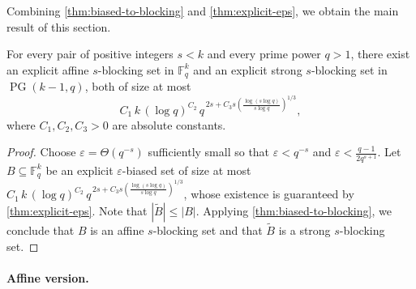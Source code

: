 \documentclass[11pt]{article}
\newif\ifdraft
\newcommand{\ZSnote}[1]{\ifdraft\textcolor{green}{[Chong: #1]}\fi}
\newcommand{\eps}{\varepsilon}
\newcommand{\ex}{\mathop{{}\mathbb{E}}}
\newcommand{\F}{\mathbb{F}}
\DeclareMathOperator{\PG}{PG}
\begin{document}
Combining \cref{thm:biased-to-blocking} and \cref{thm:explicit-eps}, we obtain the main result of this section.

\begin{proposition}\label{prop:explicit-biased-to-explicit-blocking}
For every pair of positive integers $s<k$ and every prime power $q>1$, there exist an explicit affine $s$-blocking set in $\F_q^k$ and an explicit strong $s$-blocking set in $\PG(k-1,q)$, both of size at most
\[
C_1\,k\,(\log q)^{C_2}\,q^{\,2s + C_3 s \left(\frac{\log(s\log q)}{s\log q}\right)^{1/3}},
\]
where $C_1,C_2,C_3>0$ are absolute constants.
\end{proposition}

\begin{proof}
Choose $\eps=\Theta(q^{-s})$ sufficiently small so that $\eps<q^{-s}$ and $\eps<\frac{q-1}{2q^{s+1}}$. Let $B\subseteq\F_q^k$ be an explicit $\eps$-biased set of size at most $C_1\,k\,(\log q)^{C_2}\,q^{\,2s + C_3 s \left(\frac{\log(s\log q)}{s\log q}\right)^{1/3}}$,
whose existence is guaranteed by \cref{thm:explicit-eps}. Note that $|\widetilde{B}|\le |B|$. Applying \cref{thm:biased-to-blocking}, we conclude that $B$ is an affine $s$-blocking set and that $\widetilde{B}$ is a strong $s$-blocking set.
\end{proof}

\iffalse
\ZSnote{If $S\subseteq G$ is an $\eps$-biased set with $\eps<q^{-s}$, then it is also an affine $s$-blocking set.}

\ZSnote{Let $S\subseteq G$ be an $\eps$-biased set with $\eps<\frac{q-1}{2q^{s+1}}$. Then $\tilde{B}$ is a strong $s$-blocking set. To see this, it suffices to show that for every vector space $V$ of codimension $s$ and every hypergraph $H$ of $V$, $\tilde{B}\cap(V\setminus H)\neq\emptyset$. Let $f=1_V-1_H=1_{V\setminus H}$ and we proceed to show $\ex_{x\in S}f(x)\neq 0$. Indeed, by \cref{lem:epsfool} and \cref{lem:l1bound}, $\ex_{x\in S}f(x)\ge \ex_{x\in\F_q^k}f(x)-\eps\|\widehat{1_{f}}\|_1\ge q^{-s}-q^{-s-1}-2\eps>0$, as needed.}

\ZSnote{\cite{JM21} gave explicit constructions of $\eps$-biased set with size $O\left(\frac{k(\log q)^{O(1)}}{\eps^{2+o(1)}}\right)$ and therefore leads to explicit constructions of affine/strong $s$-blocking sets of size $O(k(\log q)^{O(1)}q^{2s+o(s)})$.}

\paragraph{Affine version.}
\end{document}
